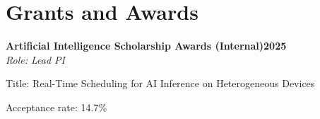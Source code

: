 \documentclass[letterpaper,10pt]{article}
\newcommand{\heading}[2]{
  \hspace{10pt}#1\hfill#2\\
}
\newcommand{\headingBf}[2]{
  \heading{\textbf{#1}}{\textbf{#2}}
}
\newcommand{\headingIt}[2]{
  \heading{\textit{#1}}{\textit{#2}}
}
\newenvironment{resume_list}{
  \vspace{-7pt}
  \begin{itemize}[itemsep=-2px, parsep=1pt, leftmargin=30pt]
}{
  \end{itemize}
}
\newcommand{\itemTitle}[1]{
  \item[] \underline{#1}\vspace{4pt}
}
\begin{document}
\section{Grants and Awards}
\headingBf{Artificial Intelligence Scholarship Awards (Internal)}{2025}
\headingIt{Role: Lead PI}{}
\begin{resume_list}
    \item Title: Real-Time Scheduling for AI Inference on Heterogeneous Devices
    \item Acceptance rate: 14.7\%
\end{resume_list}

    



\end{document}

